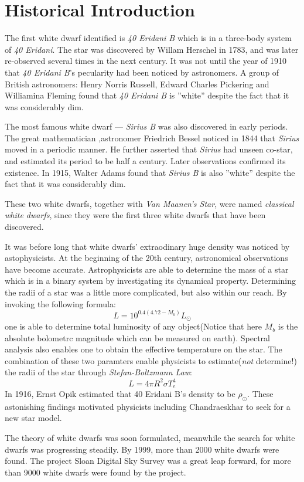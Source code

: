 \documentclass[preprint]{revtex4-1}
\begin{document}
\section{Historical Introduction}
The first white dwarf identified is \emph{40 Eridani B} which is in a three-body system of \emph{40 Eridani}. The star was discovered by Willam Herschel in 1783, and was later re-observed several times in the next century. It was not until the year of 1910 that \emph{40 Eridani B}'s pecularity had been noticed by astronomers. A group of British astronomers: Henry Norris Russell, Edward Charles Pickering and Williamina Fleming found that \emph{40 Eridani B} is ''white'' despite the fact that it was considerably dim. \par
The most famous white dwarf --- \emph{Sirius B} was also discovered in early periods. The great mathematician ,astronomer Friedrich Bessel noticed in 1844 that \emph{Sirius} moved in a periodic manner. He further asserted that \emph{Sirius} had unseen co-star, and estimated its period to be half a century. Later observations confirmed its existence. In 1915, Walter Adams found that \emph{Sirius B} is also ''white'' despite the fact that it was considerably dim.\par
These two white dwarfs, together with \emph{Van Maanen's Star}, were named \emph{classical white dwarfs}, since they were the first three white dwarfs that have been discovered.\par
It was before long that white dwarfs' extraodinary huge density was noticed by astophysicists. At the beginning of the 20th century, astronomical observations have become accurate. Astrophysicists are able to determine the mass of a star which is in a binary system by investigating its dynamical property. Determining the radii of a star was a little more complicated, but also within our reach. By invoking the following formula:\\
\begin{equation}
L=10^{0.4(4.72-M_b)}L_{\odot}
\end{equation}
one is able to determine total luminosity of any object(Notice that here $M_b$ is the absolute bolometrc magnitude which can be measured on earth). Spectral analysis also enables one to obtain the effective temperature on the star. The combination of these two paramters enable physicists to estimate(\emph{not} determine!) the radii of the star through \emph{Stefan-Boltzmann Law}:
\begin{equation}
L=4\pi R^{2}\sigma T_e^{4}
\end{equation}
In 1916, Ernst Opik estimated that 40 Eridani B's density to be $\rho_{\odot}$. These astonishing findings motivated physicists including Chandraeskhar to seek for a new star model.\par
The theory of white dwarfs was soon formulated, meanwhile the search for white dwarfs was progressing steadily. By 1999, more than 2000 white dwarfs were found. The project Sloan Digital Sky Survey was a great leap forward, for more than 9000 white dwarfs were found by the project.
\end{document}
